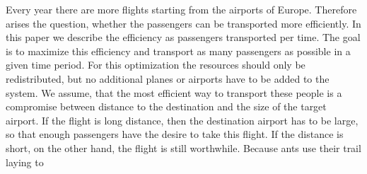 Every year there are more flights starting from the airports of Europe. Therefore arises the question, whether the passengers can be transported more efficiently. In this paper we describe the efficiency as passengers transported per time. The goal is to maximize this efficiency and transport as many passengers as possible in a given time period. For this optimization the resources should only be redistributed, but no additional planes or airports have to be added to the system. 
We assume, that the most efficient way to transport these people is a compromise between distance to the destination and the size of the target airport. If the flight is long distance, then the destination airport has to be large, so that enough passengers have the desire to take this flight. If the distance is short, on the other hand, the flight is still worthwhile. 
Because ants use their trail laying to 